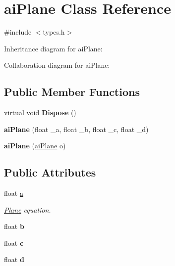 \hypertarget{structai_plane}{\section{ai\+Plane Class Reference}
\label{structai_plane}
}


{\ttfamily \#include $<$types.\+h$>$}



Inheritance diagram for ai\+Plane\+:


Collaboration diagram for ai\+Plane\+:
\subsection*{Public Member Functions}
\begin{DoxyCompactItemize}
\item 
\hypertarget{structai_plane_a6566414460966c64324a1c796d5d4dd4}{virtual void {\bfseries Dispose} ()}\label{structai_plane_a6566414460966c64324a1c796d5d4dd4}

\item 
\hypertarget{structai_plane_a0e29c77b4921cf07113aa9a9bc8203b9}{{\bfseries ai\+Plane} (float \+\_\+a, float \+\_\+b, float \+\_\+c, float \+\_\+d)}\label{structai_plane_a0e29c77b4921cf07113aa9a9bc8203b9}

\item 
\hypertarget{structai_plane_aaf2fcc1b7cbad6ebb007b12688010def}{{\bfseries ai\+Plane} (\hyperlink{structai_plane}{ai\+Plane} o)}\label{structai_plane_aaf2fcc1b7cbad6ebb007b12688010def}

\end{DoxyCompactItemize}
\subsection*{Public Attributes}
\begin{DoxyCompactItemize}
\item 
\hypertarget{structai_plane_aeadf64e70e6daf1f7f431c90cfc8bce1}{float \hyperlink{structai_plane_aeadf64e70e6daf1f7f431c90cfc8bce1}{a}}\label{structai_plane_aeadf64e70e6daf1f7f431c90cfc8bce1}

\begin{DoxyCompactList}\small\item\em \hyperlink{class_plane}{Plane} equation. \end{DoxyCompactList}\item 
\hypertarget{structai_plane_a84ab33cd9b2f5325282b489f8a2bf11c}{float {\bfseries b}}\label{structai_plane_a84ab33cd9b2f5325282b489f8a2bf11c}

\item 
\hypertarget{structai_plane_a7b0ea36c355ca003a5789088fb24da1f}{float {\bfseries c}}\label{structai_plane_a7b0ea36c355ca003a5789088fb24da1f}

\item 
\hypertarget{structai_plane_ab8696b583b6fab46ae30cd5b691e7c9a}{float {\bfseries d}}\label{structai_plane_ab8696b583b6fab46ae30cd5b691e7c9a}

\end{DoxyCompactItemize}
